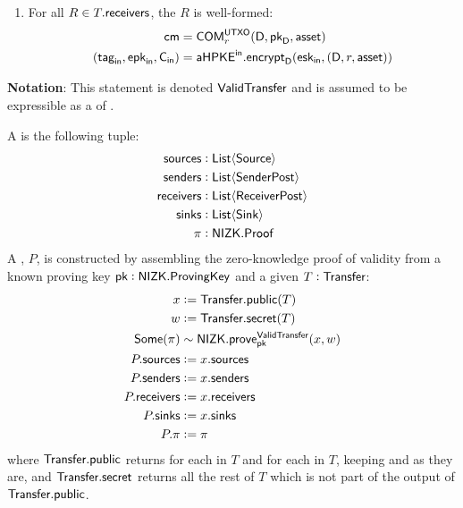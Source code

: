 \begin{definition}
\begin{enumerate}
        \item For all $R \in T.{\textsf{receivers}}$, the \Receiver{} $R$ is well-formed:
            \begin{align*}
                {\textsf{cm}}            &= {\textsf{COM}}^{{\textsf{UTXO}}}_{r}(\textsf{D}, {{\textsf{pk}}_\textsf{D}}, {\textsf{asset}}) \\
                ({{\textsf{tag}}_\textsf{in}}, {{\textsf{epk}}_\textsf{in}}, {\textsf{C}_\textsf{in}}) &= {{\textsf{aHPKE}}^\textsf{in}}.{\textsf{encrypt}}_\textsf{D}({{\textsf{esk}}_\textsf{in}}, (\textsf{D}, r, {\textsf{asset}}))
            \end{align*}
    \end{enumerate}
    \textbf{Notation}: This statement is denoted ${\textsf{ValidTransfer}}$ and is assumed to be expressible as a \Statement{} of \NIZK{}.
\end{definition}

\begin{definition}
    A \TransferPost{} is the following tuple:
    \begin{align*}
        {\textsf{sources}}    &: {\textsf{List}}\langle{{\textsf{Source}}}\rangle \\
        {\textsf{senders}}    &: {\textsf{List}}\langle{{\textsf{SenderPost}}}\rangle \\
        {\textsf{receivers}}  &: {\textsf{List}}\langle{{\textsf{ReceiverPost}}}\rangle \\
        {\textsf{sinks}}      &: {\textsf{List}}\langle{{\textsf{Sink}}}\rangle \\
        \pi         &: {\textsf{NIZK}}.{\textsf{Proof}} 
    \end{align*}
    A \TransferPost{}, $P$, is constructed by assembling the zero-knowledge proof of \Transfer{} validity from a known proving key ${\textsf{pk}} : {\textsf{NIZK}}.{\textsf{ProvingKey}}$ and a given $T : {\textsf{Transfer}}$:
    \begin{align*}
        x             &:= {\textsf{Transfer}}.{\textsf{public}}(T) \\
        w             &:= {\textsf{Transfer}}.{\textsf{secret}}(T) \\
        {\textsf{Some}}(\pi)    &\sim {\textsf{NIZK}}.{\textsf{prove}}^{\textsf{ValidTransfer}}_{{\textsf{pk}}}(x, w) \\
        P.{\textsf{sources}}    &:= x.{\textsf{sources}} \\
        P.{\textsf{senders}}    &:= x.{\textsf{senders}} \\
        P.{\textsf{receivers}}  &:= x.{\textsf{receivers}} \\
        P.{\textsf{sinks}}      &:= x.{\textsf{sinks}} \\
        P.\pi         &:= \pi
    \end{align*}
    where ${\textsf{Transfer}}.{\textsf{public}}$ returns  for each \Sender{} in $T$ and  for each \Receiver{} in $T$, keeping  and  as they are, and ${\textsf{Transfer}}.{\textsf{secret}}$ returns all the rest of $T$ which is not part of the output of ${\textsf{Transfer}}.{\textsf{public}}$.
\end{definition}

